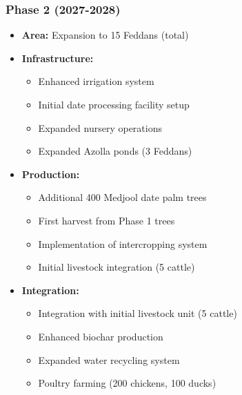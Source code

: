 \subsubsection{Phase 2 (2027-2028)}
\begin{itemize}
    \item \textbf{Area:} Expansion to 15 Feddans (total)
    \item \textbf{Infrastructure:}
    \begin{itemize}
        \item Enhanced irrigation system
        \item Initial date processing facility setup
        \item Expanded nursery operations
        \item Expanded Azolla ponds (3 Feddans)
    \end{itemize}
    \item \textbf{Production:}
    \begin{itemize}
        \item Additional 400 Medjool date palm trees
        \item First harvest from Phase 1 trees
        \item Implementation of intercropping system
        \item Initial livestock integration (5 cattle)
    \end{itemize}
    \item \textbf{Integration:}
    \begin{itemize}
        \item Integration with initial livestock unit (5 cattle)
        \item Enhanced biochar production
        \item Expanded water recycling system
        \item Poultry farming (200 chickens, 100 ducks)
    \end{itemize}
\end{itemize}

